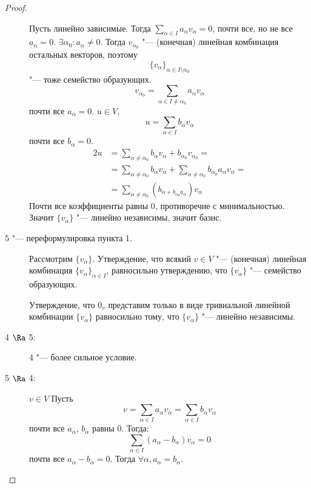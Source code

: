 \begin{proof}
\begin{description}
		Пусть линейно зависимые. Тогда $\sum_{\alpha \in I} a_{\alpha}v_{\alpha} = 0$, почти все, но не все $a_{\alpha} = 0$.
		$\exists \alpha_0: a_{\alpha} \ne 0$. Тогда
		$v_{\alpha_0}$ "--- (конечная) линейная комбинация остальных векторов, поэтому
		\[ \{v_{\alpha}\}_{\alpha \in I \setminus {\alpha_0}} \]
		"--- тоже семейство образующих.
		\[ v_{\alpha_0} = \sum_{\alpha \in I \ne \alpha_0} a_{\alpha}v_{\alpha} \]
		почти все $a_{\alpha} = 0$.
		$u \in V$,
		\[ u = \sum_{\alpha \in I}b_{\alpha}v_{\alpha} \]
		почти все $b_{\alpha} = 0$.
		\begin{alignat*}{2}
			u &= \sum_{\alpha \ne \alpha_{0}}b_{\alpha}v_{\alpha} + b_{\alpha_0}v_{\alpha_0} = \\
			  &= \sum_{\alpha \ne \alpha_{0}}b_{\alpha}v_{\alpha} + \sum_{\alpha \ne \alpha_{0}}b_{\alpha_0}a_{\alpha}v_{\alpha} = \\
			  &= \sum _{\alpha \ne \alpha_0}(b_{\alpha + b_{\alpha_0}a_{\alpha}})v_{\alpha}
		\end{alignat*}
		Почти все коэффициенты равны 0, противоречие с минимальностью. Значит $\{v_{\alpha}\}$ "--- линейно независимы, значит базис.

	\item [5 "--- переформулировка пункта 1.]
		Рассмотрим $\{v_{\alpha}\}$.
		Утверждение, что всякий $v \in V$ "--- (конечная) линейная комбинация $\{v_{\alpha}\}_{\alpha \in I}$, равносильно
		утверждению, что $\{v_{\alpha}\}$ "--- семейство образующих.

		Утверждение, что $0_v$ представим только в виде тривиальной линейной комбинации $\{v_{\alpha}\}$ равносильно тому,
		что $\{v_{\alpha}\}$ "--- линейно независимы.

	\item [4 $\Ra$ 5:]
		4 "--- более сильное условие.

	\item [5 $\Ra$ 4:]
		$v \in V$
		Пусть
		\[ v = \sum_{\alpha \in I}a_{\alpha}v_{\alpha} = \sum_{\alpha \in I} b_{\alpha}v_{\alpha} \]
		почти все $a_{\alpha}$, $b_{\alpha}$ равны 0. Тогда:
		\[ \sum_{\alpha \in I}(a_{\alpha} - b_{\alpha})v_{\alpha} = 0 \]
		почти все $a_{\alpha} - b_{\alpha} = 0$.
		Тогда $\forall \alpha, a_\alpha = b_\alpha$.
	\end{description}
\end{proof}

